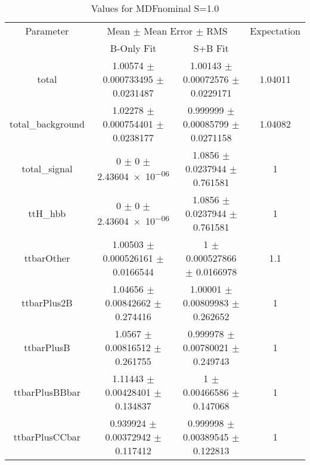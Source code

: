\begin{table}
\centering
\caption{Values for MDFnominal S=1.0}
\begin{tabular}{cccc}
\toprule
Parameter & \multicolumn{2}{c}{Mean $\pm$ Mean Error $\pm$ RMS} & Expectation\\
 & B-Only Fit & S+B Fit & \\
\midrule
total & \num{1.00574} $\pm$ \num{0.000733495} $\pm$ \num{0.0231487} & \num{1.00143} $\pm$ \num{0.00072576} $\pm$ \num{0.0229171} & \num{1.04011}\\
total\_background & \num{1.02278} $\pm$ \num{0.000754401} $\pm$ \num{0.0238177} & \num{0.999999} $\pm$ \num{0.00085799} $\pm$ \num{0.0271158} & \num{1.04082}\\
total\_signal & \num{0} $\pm$ \num{0} $\pm$ \num{2.43604e-06} & \num{1.0856} $\pm$ \num{0.0237944} $\pm$ \num{0.761581} & \num{1}\\
ttH\_hbb & \num{0} $\pm$ \num{0} $\pm$ \num{2.43604e-06} & \num{1.0856} $\pm$ \num{0.0237944} $\pm$ \num{0.761581} & \num{1}\\
ttbarOther & \num{1.00503} $\pm$ \num{0.000526161} $\pm$ \num{0.0166544} & \num{1} $\pm$ \num{0.000527866} $\pm$ \num{0.0166978} & \num{1.1}\\
ttbarPlus2B & \num{1.04656} $\pm$ \num{0.00842662} $\pm$ \num{0.274416} & \num{1.00001} $\pm$ \num{0.00809983} $\pm$ \num{0.262652} & \num{1}\\
ttbarPlusB & \num{1.0567} $\pm$ \num{0.00816512} $\pm$ \num{0.261755} & \num{0.999978} $\pm$ \num{0.00780021} $\pm$ \num{0.249743} & \num{1}\\
ttbarPlusBBbar & \num{1.11443} $\pm$ \num{0.00428401} $\pm$ \num{0.134837} & \num{1} $\pm$ \num{0.00466586} $\pm$ \num{0.147068} & \num{1}\\
ttbarPlusCCbar & \num{0.939924} $\pm$ \num{0.00372942} $\pm$ \num{0.117412} & \num{0.999998} $\pm$ \num{0.00389545} $\pm$ \num{0.122813} & \num{1}\\
\bottomrule
\end{tabular}
\end{table}